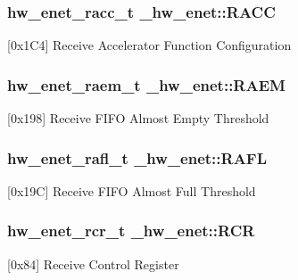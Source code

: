 \subsubsection[{\texorpdfstring{R\+A\+CC}{RACC}}]{ {\bf hw\+\_\+enet\+\_\+racc\+\_\+t} \+\_\+hw\+\_\+enet\+::\+R\+A\+CC}\hypertarget{struct__hw__enet_a736659a4014abadb3067340a3f5cb85c}{}\label{struct__hw__enet_a736659a4014abadb3067340a3f5cb85c}
\mbox{[}0x1\+C4\mbox{]} Receive Accelerator Function Configuration 
\subsubsection[{\texorpdfstring{R\+A\+EM}{RAEM}}]{ {\bf hw\+\_\+enet\+\_\+raem\+\_\+t} \+\_\+hw\+\_\+enet\+::\+R\+A\+EM}\hypertarget{struct__hw__enet_af4a5dc66a2f1a003c91ba61f70c18601}{}\label{struct__hw__enet_af4a5dc66a2f1a003c91ba61f70c18601}
\mbox{[}0x198\mbox{]} Receive F\+I\+FO Almost Empty Threshold 
\subsubsection[{\texorpdfstring{R\+A\+FL}{RAFL}}]{ {\bf hw\+\_\+enet\+\_\+rafl\+\_\+t} \+\_\+hw\+\_\+enet\+::\+R\+A\+FL}\hypertarget{struct__hw__enet_a2979771f272882919e214ed85cb1392c}{}\label{struct__hw__enet_a2979771f272882919e214ed85cb1392c}
\mbox{[}0x19C\mbox{]} Receive F\+I\+FO Almost Full Threshold 
\subsubsection[{\texorpdfstring{R\+CR}{RCR}}]{ {\bf hw\+\_\+enet\+\_\+rcr\+\_\+t} \+\_\+hw\+\_\+enet\+::\+R\+CR}\hypertarget{struct__hw__enet_a46d2fbfc019700f4314050f7b233331e}{}\label{struct__hw__enet_a46d2fbfc019700f4314050f7b233331e}
\mbox{[}0x84\mbox{]} Receive Control Register 

